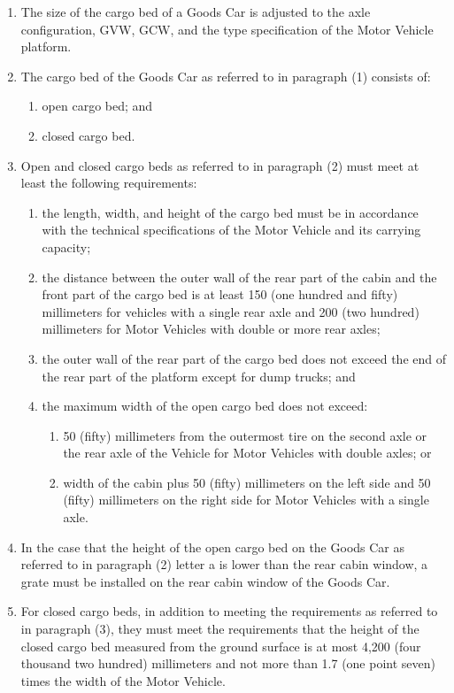 \begin{enumerate}[noitemsep]
  \item The size of the cargo bed of a Goods Car is adjusted to the axle configuration, GVW, GCW, and the type specification of the Motor Vehicle platform.
  \item The cargo bed of the Goods Car as referred to in paragraph (1) consists of:
  \begin{enumerate}[noitemsep]
    \item open cargo bed; and
    \item closed cargo bed.
  \end{enumerate}
  \item Open and closed cargo beds as referred to in paragraph (2) must meet at least the following requirements:
  \begin{enumerate}[noitemsep]
    \item the length, width, and height of the cargo bed must be in accordance with the technical specifications of the Motor Vehicle and its carrying capacity;
    \item the distance between the outer wall of the rear part of the cabin and the front part of the cargo bed is at least 150 (one hundred and fifty) millimeters for vehicles with a single rear axle and 200 (two hundred) millimeters for Motor Vehicles with double or more rear axles;
    \item the outer wall of the rear part of the cargo bed does not exceed the end of the rear part of the platform except for dump trucks; and
    \item the maximum width of the open cargo bed does not exceed:
    \begin{enumerate}[noitemsep]
      \item 50 (fifty) millimeters from the outermost tire on the second axle or the rear axle of the Vehicle for Motor Vehicles with double axles; or
      \item width of the cabin plus 50 (fifty) millimeters on the left side and 50 (fifty) millimeters on the right side for Motor Vehicles with a single axle.
    \end{enumerate}
  \end{enumerate}
  \item In the case that the height of the open cargo bed on the Goods Car as referred to in paragraph (2) letter a is lower than the rear cabin window, a grate must be installed on the rear cabin window of the Goods Car.
  \item For closed cargo beds, in addition to meeting the requirements as referred to in paragraph (3), they must meet the requirements that the height of the closed cargo bed measured from the ground surface is at most 4,200 (four thousand two hundred) millimeters and not more than 1.7 (one point seven) times the width of the Motor Vehicle.
\end{enumerate}

